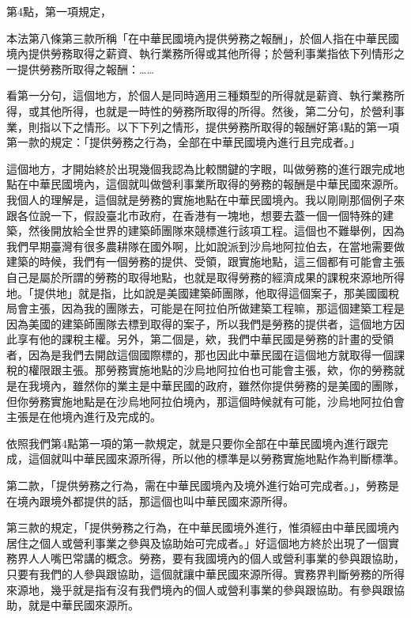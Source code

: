 \documentclass[]{ctexbook}
\begin{document}
第4點，第一項規定，

本法第八條第三款所稱「在中華民國境內提供勞務之報酬」，於個人指在中華民國境內提供勞務取得之薪資、執行業務所得或其他所得；於營利事業指依下列情形之一提供勞務所取得之報酬：\ldots\ldots{}

看第一分句，這個地方，於個人是同時適用三種類型的所得就是薪資、執行業務所得，或其他所得，也就是一時性的勞務所取得的所得。然後，第二分句，於營利事業，則指以下之情形。以下下列之情形，提供勞務所取得的報酬好第4點的第一項第一款的規定：「提供勞務之行為，全部在中華民國境內進行且完成者。」

這個地方，才開始終於出現幾個我認為比較關鍵的字眼，叫做勞務的進行跟完成地點在中華民國境內，這個就叫做營利事業所取得的勞務的報酬是中華民國來源所。我個人的理解是，這個就是勞務的實施地點在中華民國境內。我以剛剛那個例子來跟各位說一下，假設臺北市政府，在香港有一塊地，想要去蓋一個一個特殊的建築，然後開放給全世界的建築師團隊來競標進行該項工程。這個也不難舉例，因為我們早期臺灣有很多農耕隊在國外啊，比如說派到沙烏地阿拉伯去，在當地需要做建築的時候，我們有一個勞務的提供、受領，跟實施地點，這三個都有可能會主張自己是屬於所謂的勞務的取得地點，也就是取得勞務的經濟成果的課稅來源地所得地。「提供地」就是指，比如說是美國建築師團隊，他取得這個案子，那美國國稅局會主張，因為我的團隊去，可能是在阿拉伯所做建築工程嘛，那這個建築工程是因為美國的建築師團隊去標到取得的案子，所以我們是勞務的提供者，這個地方因此享有他的課稅主權。另外，第二個是，欸，我們中華民國是勞務的計畫的受領者，因為是我們去開啟這個國際標的，那也因此中華民國在這個地方就取得一個課稅的權限跟主張。那勞務實施地點的沙烏地阿拉伯也可能會主張，欸，你的勞務就是在我境內，雖然你的業主是中華民國的政府，雖然你提供勞務的是美國的團隊，但你勞務實施地點是在沙烏地阿拉伯境內，那這個時候就有可能，沙烏地阿拉伯會主張是在他境內進行及完成的。

依照我們第4點第一項的第一款規定，就是只要你全部在中華民國境內進行跟完成，這個就叫中華民國來源所得，所以他的標準是以勞務實施地點作為判斷標準。

第二款，「提供勞務之行為，需在中華民國境內及境外進行始可完成者。」，勞務是在境內跟境外都提供的話，那這個也叫中華民國來源所得。

第三款的規定，「提供勞務之行為，在中華民國境外進行，惟須經由中華民國境內居住之個人或營利事業之參與及協助始可完成者。」好這個地方終於出現了一個實務界人人嘴巴常講的概念。勞務，要有我國境內的個人或營利事業的參與跟協助，只要有我們的人參與跟協助，這個就讓中華民國來源所得。實務界判斷勞務的所得來源地，幾乎就是指有沒有我們境內的個人或營利事業的參與跟協助。有參與跟協助，就是中華民國來源所。
\end{document}

